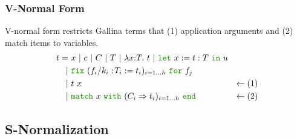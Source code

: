 \documentclass[a4paper,fleqn]{article}
\def\gallina{\textrm{Gallina}}
\newcommand{\kwlet}{\mbox{\color{mygreen}\ttfamily let}}
\newcommand{\kwin}{\mbox{\color{mygreen}\ttfamily in}}
\newcommand{\kwmatch}{\mbox{\color{mygreen}\ttfamily match}}
\newcommand{\kwwith}{\mbox{\color{mygreen}\ttfamily with}}
\newcommand{\kwend}{\mbox{\color{mygreen}\ttfamily end}}
\newcommand{\kwfix}{\mbox{\color{mygreen}\ttfamily fix}}
\newcommand{\kwfor}{\mbox{\color{mygreen}\ttfamily for}}
\newcommand{\lamT}[3]{\lambda #1\mathord{:}#2.~#3}
\newcommand{\letin}[3]{\kwlet~#1:=#2~\kwin~#3}
\newcommand{\match}[4]{\kwmatch~#1~\kwwith~(#2 \Rightarrow #3)_{#4}~\kwend}
\newcommand{\fixT}[5]{\kwfix~(#1:\!#2 := #3)_{#4}~\kwfor~#5}
\begin{document}
\subsubsection{V-Normal Form}\label{sec:v-normal-form}
V-normal form restricts \gallina{} terms that (1) application arguments and (2) match items to variables.
\begin{align*}
  t =&\ x~|~c~|~C~|~T~|~\lamT{x}{T}{t}~|~ \letin{x}{t:T}{u} \\
    |&\ \fixT{f_i/k_i}{T_i}{t_i}{i=1\dots h}{f_j} \\
    |&\ t~x                               & \leftarrow (1) \\
    |&\ \match{x}{C_i}{t_i}{i=1\dots h} & \leftarrow (2)
\end{align*}

\subsection{S-Normalization}\label{sec:s-normalization}
\end{document}

